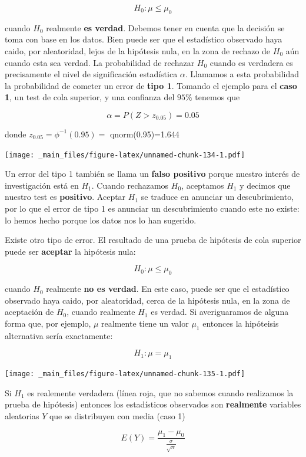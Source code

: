 \documentclass[
]{book}
\begin{document}
\[H_0: \mu\leq\mu_0\]

cuando \(H_0\) realmente \textbf{es verdad}. Debemos tener en cuenta que la decisión se toma con base en los datos. Bien puede ser que el estadístico observado haya caido, por aleatoridad, lejos de la hipótesis nula, en la zona de rechazo de \(H_0\) aún cuando esta sea verdad. La probabilidad de rechazar \(H_0\) cuando es verdadera es precisamente el nivel de significación estadística \(\alpha\). Llamamos a esta probabilidad la probabilidad de cometer un error de \textbf{tipo 1}. Tomando el ejemplo para el \textbf{caso 1}, un test de cola superior, y una confianza del \(95\%\) tenemos que

\[\alpha = P(Z> z_{0.05})=0.05\]

donde \(z_{0.05}=\phi^{-1}(0.95)=\) qnorm(0.95)=1.644

\texttt{[image: \_main\_files/figure-latex/unnamed-chunk-134-1.pdf]}

Un error del tipo 1 también se llama un \textbf{falso positivo} porque nuestro interés de investigación está en \(H_1\). Cuando rechazamos \(H_0\), aceptamos \(H_1\) y decimos que nuestro test es \textbf{positivo}. Aceptar \(H_1\) se traduce en anunciar un descubrimiento, por lo que el error de tipo 1 es anunciar un descubrimiento cuando este no existe: lo hemos hecho porque los datos nos lo han sugerido.

Existe otro tipo de error. El resultado de una prueba de hipótesis de cola superior puede ser \textbf{aceptar} la hipótesis nula:

\[H_0: \mu\leq\mu_0\]

cuando \(H_0\) realmente \textbf{no es verdad}. En este caso, puede ser que el estadístico observado haya caido, por aleatoridad, cerca de la hipótesis nula, en la zona de aceptación de \(H_0\), cuando realmente \(H_1\) es verdad. Si averiguaramos de alguna forma que, por ejemplo, \(\mu\) realmente tiene un valor \(\mu_1\) entonces la hipóteisis alternativa sería exactamente:

\[H_1: \mu=\mu_1\]

\texttt{[image: \_main\_files/figure-latex/unnamed-chunk-135-1.pdf]}

Si \(H_1\) es realemente verdadera (línea roja, que no sabemos cuando realizamos la prueba de hipótesis) entonces los estadísticos observados son \textbf{realmente} variables aleatorias \(Y\) que se distribuyen con media (caso 1)

\[E(Y)=\frac{\mu_1-\mu_0}{\frac{\sigma}{\sqrt{n}}}\]
\end{document}
